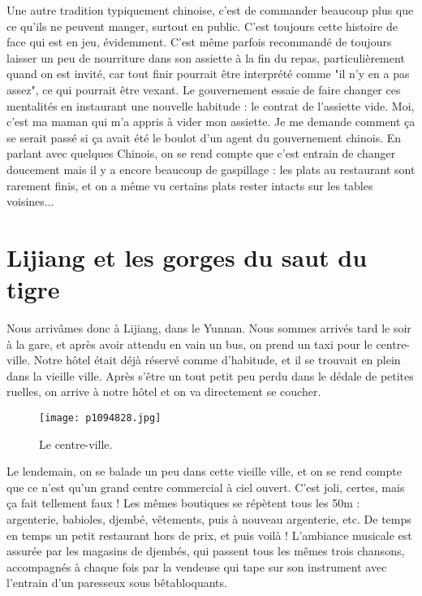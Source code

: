 \documentclass{book}
\begin{document}
Une autre tradition typiquement chinoise, c'est de commander beaucoup plus que ce qu'ils ne peuvent manger, surtout en public. C'est toujours cette histoire de face qui est en jeu, évidemment. C'est même parfois recommandé de toujours laisser un peu de nourriture dans son assiette à la fin du repas, particulièrement quand on est invité, car tout finir pourrait être interprété comme "il n'y en a pas assez", ce qui pourrait être vexant. Le gouvernement essaie de faire changer ces mentalités en instaurant une nouvelle habitude : le contrat de l'assiette vide. Moi, c'est ma maman qui m'a appris à vider mon assiette. Je me demande comment ça se serait passé si ça avait été le boulot d'un agent du gouvernement chinois. En parlant avec quelques Chinois, on se rend compte que c'est entrain de changer doucement mais il y a encore beaucoup de gaspillage : les plats au restaurant sont rarement finis, et on a même vu certains plats rester intacts sur les tables voisines...



\chapter{Lijiang et les gorges du saut du tigre}
Nous arrivâmes donc à Lijiang, dans le Yunnan. Nous sommes arrivés tard le soir à la gare, et après avoir attendu en vain un bus, on prend un taxi pour le centre-ville. Notre hôtel était déjà réservé comme d'habitude, et il se trouvait en plein dans la vieille ville. Après s'être un tout petit peu perdu dans le dédale de petites ruelles, on arrive à notre hôtel et on va directement se coucher.


\begin{figure}[h]
\centering
\texttt{[image: p1094828.jpg]}
\caption*{Le centre-ville.}
\end{figure}

Le lendemain, on se balade un peu dans cette vieille ville, et on se rend compte que ce n'est qu'un grand centre commercial à ciel ouvert. C'est joli, certes, mais ça fait tellement faux ! Les mêmes boutiques se répètent tous les 50m : argenterie, babioles, djembé, vêtements, puis à nouveau argenterie, etc. De temps en temps un petit restaurant hors de prix, et puis voilà ! L'ambiance musicale est assurée par les magasins de djembés, qui passent tous les mêmes trois chansons, accompagnés à chaque fois par la vendeuse qui tape sur son instrument avec l'entrain d'un paresseux sous bêtabloquants.
\end{document}
